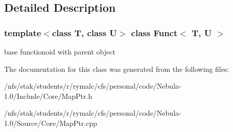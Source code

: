 \subsection{Detailed Description}
\subsubsection*{template$<$class T, class U$>$ class Funct$<$ T, U $>$}

base functionoid with parent object 

The documentation for this class was generated from the following files:\begin{DoxyCompactItemize}
\item 
/nfs/stak/students/r/rymalc/cfs/personal/code/Nebula-\/1.0/Include/Core/MapPtr.h\item 
/nfs/stak/students/r/rymalc/cfs/personal/code/Nebula-\/1.0/Source/Core/MapPtr.cpp\end{DoxyCompactItemize}
